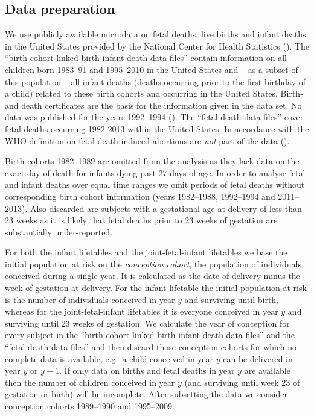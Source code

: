 \documentclass[12pt, parskip=half]{scrartcl}
\begin{document}
\begin{appendix}

\section{Data preparation}

We use publicly available microdata on fetal deaths, live births and infant deaths in the United States provided by the National Center for Health Statistics (\cite{DVS2015}). The \enquote{birth cohort linked birth-infant death data files} contain information on all children born 1983--91 and 1995--2010 in the United States and -- as a subset of this population -- all infant deaths (deaths occurring prior to the first birthday of a child) related to these birth cohorts and occurring in the United States. Birth- and death certificates are the basis for the information given in the data set. No data was published for the years 1992--1994 (\cite{Weed1995}). The \enquote{fetal death data files} cover fetal deaths occurring 1982-2013 within the United States. In accordance with the WHO definition on fetal death induced abortions are \emph{not} part of the data (\cite{Kowaleski1997}).

Birth cohorts 1982--1989 are omitted from the analysis as they lack data on the exact day of death for infants dying past 27 days of age. In order to analyse fetal and infant deaths over equal time ranges we omit periods of fetal deaths without corresponding birth cohort information (years 1982--1988, 1992--1994 and 2011--2013). Also discarded are subjects with a gestational age at delivery of less than 23 weeks as it is likely that fetal deaths prior to 23 weeks of gestation are substantially under-reported.

For both the infant lifetables and the joint-fetal-infant lifetables we base the initial population at risk on the \emph{conception cohort}, the population of individuals conceived during a single year. It is calculated as the date of delivery minus the week of gestation at delivery. For the infant lifetable the initial population at risk is the number of individuals conceived in year $y$ and surviving until birth, whereas for the joint-fetal-infant lifetables it is everyone conceived in year $y$ and surviving until 23 weeks of gestation. We calculate the year of conception for every subject in the \enquote{birth cohort linked birth-infant death data files} and the \enquote{fetal death data files} and then discard those conception cohorts for which no complete data is available, e.g.~a child conceived in year $y$ can be delivered in year $y$ or $y+1$. If only data on births and fetal deaths in year $y$ are available then the number of children conceived in year $y$ (and surviving until week 23 of gestation or birth) will be incomplete. After subsetting the data we consider conception cohorts 1989--1990 and 1995--2009.


\end{appendix}
\end{document}
